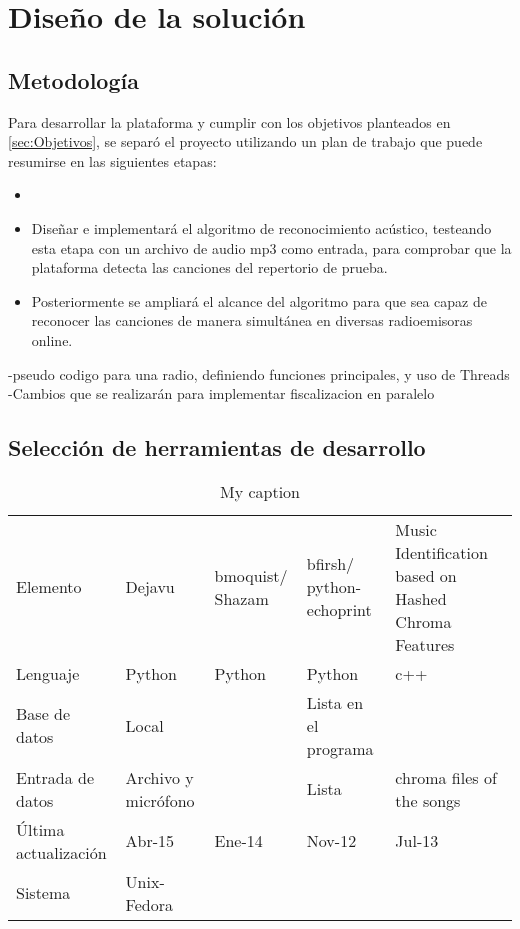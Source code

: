
\chapter{Diseño de la solución}

\section{Metodología}
Para desarrollar la plataforma y cumplir con los objetivos planteados en \ref{sec:Objetivos}, se separó el proyecto utilizando un plan de trabajo que puede resumirse en las siguientes etapas:
\begin{itemize}
\item
\item Diseñar e implementará el algoritmo de reconocimiento acústico, testeando esta etapa con un archivo de audio mp3 como entrada, para comprobar que la plataforma detecta las canciones del repertorio de prueba.
\item Posteriormente se ampliará el alcance del algoritmo para que sea capaz de reconocer las canciones de manera simultánea en diversas radioemisoras online.
\end{itemize}

-pseudo codigo para una radio, definiendo funciones principales, y uso de Threads
-Cambios que se realizarán para implementar fiscalizacion en paralelo

\section{Selección de herramientas de desarrollo}

\begin{table}[]
\centering
\caption{My caption}
\label{my-label}
\begin{tabular}{lllll}
Elemento             & Dejavu              & bmoquist/ Shazam & bfirsh/ python-echoprint & Music Identification based on Hashed Chroma Features \\
Lenguaje             & Python              & Python           & Python                   & c++                                                  \\
Base de datos        & Local               &                  & Lista en el programa     &                                                      \\
Entrada de datos     & Archivo y micrófono &                  & Lista                    & chroma files of the songs                            \\
Última actualización & Abr-15              & Ene-14           & Nov-12                   & Jul-13                                               \\
Sistema              & Unix-Fedora         &                  &                          &                                                     
\end{tabular}
\end{table}



